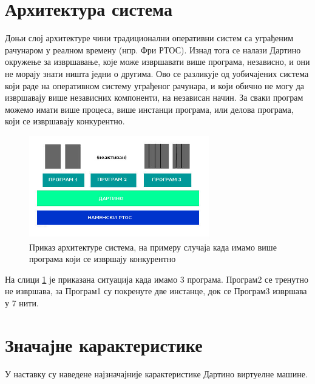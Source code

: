 \documentclass[12pt,oneside]{memoir}
\begin{document}
\section{Архитектура система}

Доњи слој архитектуре чини традиционални оперативни систем са уграђеним рачунаром у реалном времену (нпр. Фри РТОС). Изнад тога се налази Дартино окружење за извршавање, које може извршавати више програма, независно, и они не морају знати ништа једни о другима. Ово се разликује од уобичајених система који раде на оперативном систему уграђеног рачунара, и који обично не могу да извршавају више независних компоненти, на независан начин. За сваки програм можемо имати више процеса, више инстанци програма, или делова програма, који се извршавају конкурентно.\cite{Dartino}

\begin{figure}[!ht]
  \centering
  \includegraphics[width=0.7\textwidth]{arhitektura.jpg}
  \caption{ Приказ архитектуре система, на примеру случаја када имамо више програма који се извршају конкурентно}
  \label{fig:model}
\end{figure}
На слици \ref{fig:model} је приказана ситуација када имамо 3 програма. Програм2 се тренутно не извршава, за Програм1 су покренуте две инстанце, док се Програм3  извршава у 7 нити.

\section{Значајне карактеристике}

У наставку су наведене најзначајније карактеристике Дартино виртуелне машине.\cite{Dartino}
 
\end{document}

